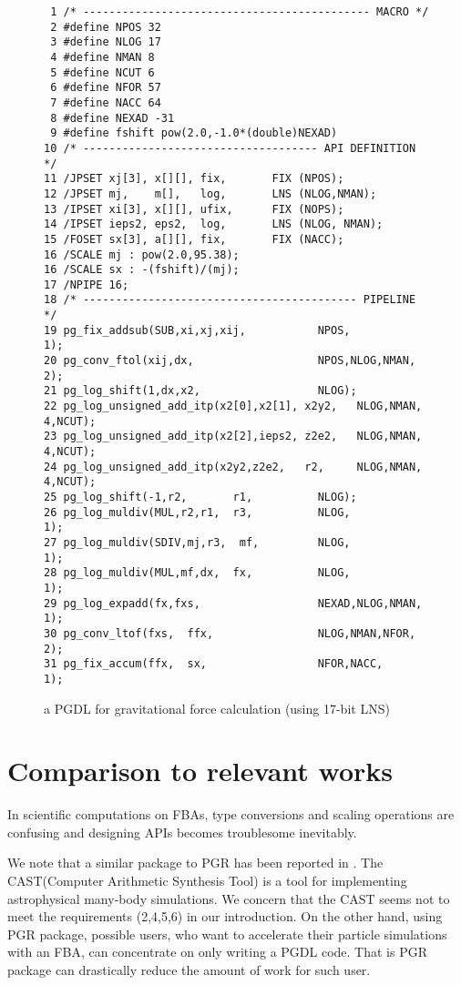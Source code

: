 \documentclass{article}
\begin{document}
{\begin{figure}[t]
\begin{minipage}[b]{1.0\linewidth}\centering
\scriptsize
{\tiny
\begin{verbatim}
 1 /* -------------------------------------------- MACRO */
 2 #define NPOS 32
 3 #define NLOG 17
 4 #define NMAN 8
 5 #define NCUT 6
 6 #define NFOR 57
 7 #define NACC 64
 8 #define NEXAD -31
 9 #define fshift pow(2.0,-1.0*(double)NEXAD)
10 /* ------------------------------------ API DEFINITION */
11 /JPSET xj[3], x[][], fix,       FIX (NPOS);
12 /JPSET mj,    m[],   log,       LNS (NLOG,NMAN);
13 /IPSET xi[3], x[][], ufix,      FIX (NOPS);
14 /IPSET ieps2, eps2,  log,       LNS (NLOG, NMAN);
15 /FOSET sx[3], a[][], fix,       FIX (NACC);
16 /SCALE mj : pow(2.0,95.38);
16 /SCALE sx : -(fshift)/(mj);
17 /NPIPE 16;
18 /* ------------------------------------------ PIPELINE */
19 pg_fix_addsub(SUB,xi,xj,xij,           NPOS,            1);
20 pg_conv_ftol(xij,dx,                   NPOS,NLOG,NMAN,  2);
21 pg_log_shift(1,dx,x2,                  NLOG);
22 pg_log_unsigned_add_itp(x2[0],x2[1], x2y2,   NLOG,NMAN, 4,NCUT);
23 pg_log_unsigned_add_itp(x2[2],ieps2, z2e2,   NLOG,NMAN, 4,NCUT);
24 pg_log_unsigned_add_itp(x2y2,z2e2,   r2,     NLOG,NMAN, 4,NCUT);
25 pg_log_shift(-1,r2,       r1,          NLOG);
26 pg_log_muldiv(MUL,r2,r1,  r3,          NLOG,            1);
27 pg_log_muldiv(SDIV,mj,r3,  mf,         NLOG,            1);
28 pg_log_muldiv(MUL,mf,dx,  fx,          NLOG,            1);
29 pg_log_expadd(fx,fxs,                  NEXAD,NLOG,NMAN, 1);
30 pg_conv_ltof(fxs,  ffx,                NLOG,NMAN,NFOR,  2);
31 pg_fix_accum(ffx,  sx,                 NFOR,NACC,       1);
\end{verbatim}
}
\end{minipage}
\caption{a PGDL for gravitational force calculation (using 17-bit LNS)}\label{figgrav5_pgdl}
\end{figure}



\section{Comparison to relevant works}
In scientific computations on FBAs,
type conversions and scaling operations are confusing and
designing APIs becomes troublesome inevitably.

We note that a similar package to PGR has been reported in
\cite{THYL04}.  The CAST(Computer Arithmetic Synthesis Tool) is a tool
for implementing astrophysical many-body simulations.  We concern that
the CAST seems not to meet the requirements (2,4,5,6) in our introduction.
On the other hand, using PGR package, possible users, 
who want to accelerate their particle simulations with an FBA,
can concentrate on only writing a PGDL code.
That is PGR package can drastically reduce the amount of work for such user.


}
\end{document}
